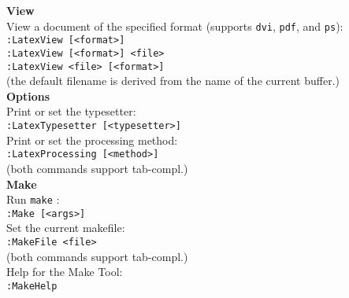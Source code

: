 \documentclass[oneside,10pt,landscape,DIV16]{scrartcl}
\begin{document}
\begin{multicols}{3}
\begin{center}
%
\parbox[t][130mm][t]{70mm}{%
%
\large{\textbf{View}}\\[1.0ex]
View a document of the specified format
(supports \texttt{dvi}, \texttt{pdf}, and \texttt{ps}): \\[1.0ex]
\texttt{:LatexView [<format>]} \\[1.0ex]
\texttt{:LatexView [<format>] <file>} \\[1.0ex]
\texttt{:LatexView <file> [<format>]} \\[1.0ex]
(the default filename is derived from the name of the current buffer.) \\[2.5ex]
%
\large{\textbf{Options}}\\[1.0ex]
Print or set the typesetter: \\[1.0ex]
\texttt{:LatexTypesetter [<typesetter>]} \\[1.0ex]
Print or set the processing method: \\[1.0ex]
\texttt{:LatexProcessing [<method>]} \\[1.0ex]
(both commands support tab-compl.) \\[2.5ex]
%
\large{\textbf{Make}}\\[1.0ex]
Run \texttt{make} : \\[1.0ex]
\texttt{:Make [<args>]} \\[1.0ex]
Set the current makefile: \\[1.0ex]
\texttt{:MakeFile <file>} \\[1.0ex]
(both commands support tab-compl.) \\[1.0ex]
Help for the Make Tool: \\[1.0ex]
\texttt{:MakeHelp} \\[2.5ex]
}
%
\end{center}%
\end{multicols}%
%
\end{document}
